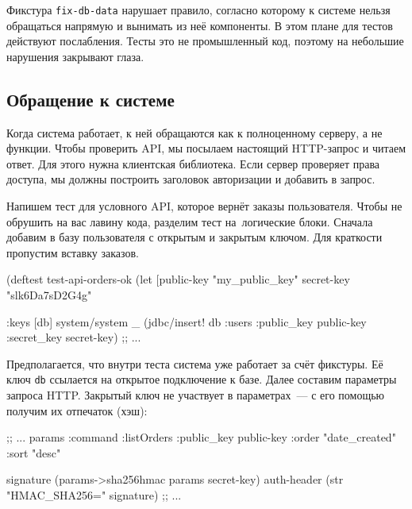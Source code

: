 Фикстура \verb|fix-db-data| нарушает правило, согласно которому к системе нельзя
обращаться напрямую и вынимать из неё компоненты. В этом плане для тестов
действуют послабления. Тесты это не промышленный код, поэтому на небольшие
нарушения закрывают глаза.

\subsection{Обращение к системе}

Когда система работает, к ней обращаются как к полноценному серверу, а не
функции. Чтобы проверить API, мы посылаем настоящий HTTP-запрос и читаем
ответ. Для этого нужна клиентская библиотека. Если сервер проверяет права
доступа, мы должны построить заголовок авторизации и добавить в запрос.

Напишем тест для условного API, которое вернёт заказы пользователя. Чтобы не
обрушить на вас лавину кода, разделим тест на~логические блоки. Сначала добавим
в базу пользователя с открытым и закрытым ключом. Для краткости пропустим
вставку заказов.

\begin{english}
  \begin{clojure}
(deftest test-api-orders-ok
  (let [public-key "my_public_key"
        secret-key "slk6Da7sD2G4g"

        {:keys [db]} system/system
        _ (jdbc/insert! db :users {:public_key public-key
                                   :secret_key secret-key})
        ;; ...
  \end{clojure}
\end{english}

Предполагается, что внутри теста система уже работает за счёт фикстуры. Её ключ
\verb|db| ссылается на открытое подключение к базе. Далее составим параметры запроса
HTTP. Закрытый ключ не участвует в параметрах~--- с его помощью получим их
отпечаток (хэш):

\begin{english}
  \begin{clojure}
        ;; ...
        params {:command :listOrders
                :public_key public-key
                :order "date_created"
                :sort "desc"}

        signature (params->sha256hmac params secret-key)
        auth-header (str "HMAC_SHA256=" signature)
        ;; ...
  \end{clojure}
\end{english}

